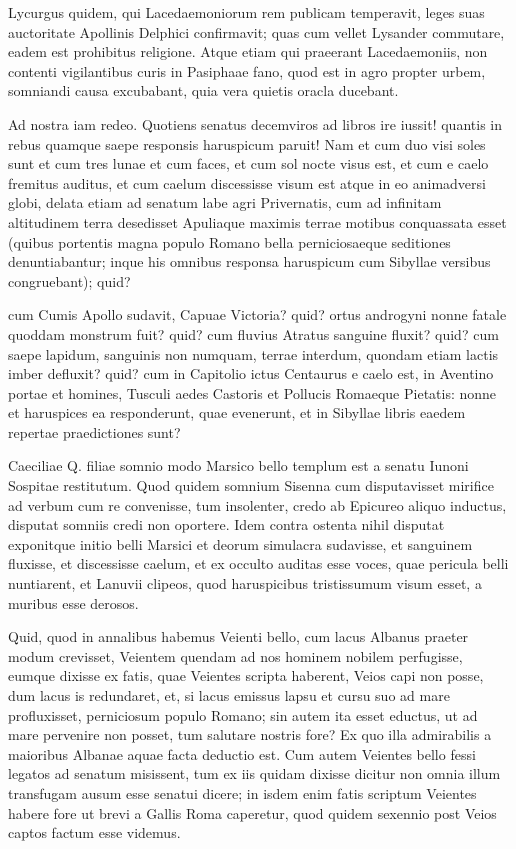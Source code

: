  Lycurgus quidem, qui Lacedaemoniorum rem publicam temperavit, leges suas auctoritate Apollinis Delphici confirmavit; quas cum vellet Lysander commutare, eadem est prohibitus religione. Atque etiam qui praeerant Lacedaemoniis, non contenti vigilantibus curis in Pasiphaae fano, quod est in agro propter urbem, somniandi causa excubabant, quia vera quietis oracla ducebant.

 Ad nostra iam redeo. Quotiens senatus decemviros ad libros ire iussit! quantis in rebus quamque saepe responsis haruspicum paruit! Nam et cum duo visi soles sunt et cum tres lunae et cum faces, et cum sol nocte visus est, et cum e caelo fremitus auditus, et cum caelum discessisse visum est atque in eo animadversi globi, delata etiam ad senatum labe agri Privernatis, cum ad infinitam altitudinem terra desedisset Apuliaque maximis terrae motibus conquassata esset (quibus portentis magna populo Romano bella perniciosaeque seditiones denuntiabantur; inque his omnibus responsa haruspicum cum Sibyllae versibus congruebant); quid?

 cum Cumis Apollo sudavit, Capuae Victoria? quid? ortus androgyni nonne fatale quoddam monstrum fuit? quid? cum fluvius Atratus sanguine fluxit? quid? cum saepe lapidum, sanguinis non numquam, terrae interdum, quondam etiam lactis imber defluxit? quid? cum in Capitolio ictus Centaurus e caelo est, in Aventino portae et homines, Tusculi aedes Castoris et Pollucis Romaeque Pietatis: nonne et haruspices ea responderunt, quae evenerunt, et in Sibyllae libris eaedem repertae praedictiones sunt?

 Caeciliae Q. filiae somnio modo Marsico bello templum est a senatu Iunoni Sospitae restitutum. Quod quidem somnium Sisenna cum disputavisset mirifice ad verbum cum re convenisse, tum insolenter, credo ab Epicureo aliquo inductus, disputat somniis credi non oportere. Idem contra ostenta nihil disputat exponitque initio belli Marsici et deorum simulacra sudavisse, et sanguinem fluxisse, et discessisse caelum, et ex occulto auditas esse voces, quae pericula belli nuntiarent, et Lanuvii clipeos, quod haruspicibus tristissumum visum esset, a muribus esse derosos.

 Quid, quod in annalibus habemus Veienti bello, cum lacus Albanus praeter modum crevisset, Veientem quendam ad nos hominem nobilem perfugisse, eumque dixisse ex fatis, quae Veientes scripta haberent, Veios capi non posse, dum lacus is redundaret, et, si lacus emissus lapsu et cursu suo ad mare profluxisset, perniciosum populo Romano; sin autem ita esset eductus, ut ad mare pervenire non posset, tum salutare nostris fore? Ex quo illa admirabilis a maioribus Albanae aquae facta deductio est. Cum autem Veientes bello fessi legatos ad senatum misissent, tum ex iis quidam dixisse dicitur non omnia illum transfugam ausum esse senatui dicere; in isdem enim fatis scriptum Veientes habere fore ut brevi a Gallis Roma caperetur, quod quidem sexennio post Veios captos factum esse videmus.

